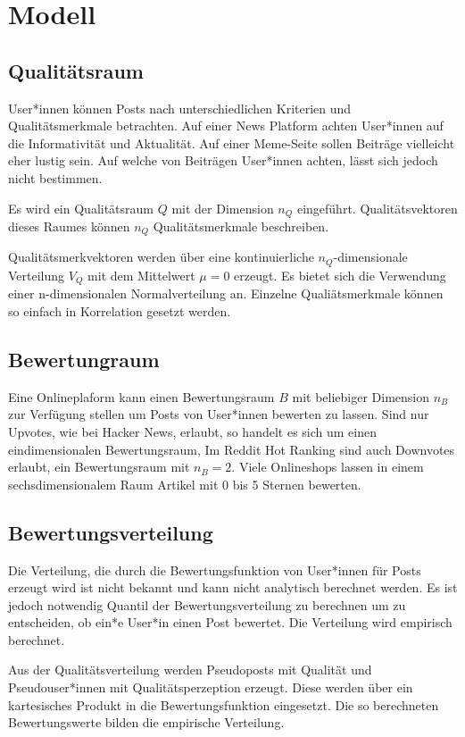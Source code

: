 \chapter{Modell}

\section{Qualitätsraum}

User*innen können Posts nach unterschiedlichen Kriterien und Qualitätsmerkmale betrachten. Auf einer News Platform achten User*innen auf die Informativität und Aktualität. Auf einer Meme-Seite sollen Beiträge vielleicht eher lustig sein. Auf welche  von Beiträgen User*innen achten, lässt sich jedoch nicht bestimmen.

Es wird ein Qualitätsraum $Q$ mit der Dimension $n_Q$ eingeführt. Qualitätsvektoren dieses Raumes können $n_Q$ Qualitätsmerkmale beschreiben.

Qualitätsmerkvektoren werden über eine kontinuierliche $n_Q$-dimensionale Verteilung $V_Q$ mit dem Mittelwert $\mu = 0$ erzeugt. Es bietet sich die Verwendung einer n-dimensionalen Normalverteilung an. Einzelne Qualiätsmerkmale können so einfach in Korrelation gesetzt werden. 

\section{Bewertungraum}

Eine Onlineplaform kann einen Bewertungsraum $B$ mit beliebiger Dimension $n_B$ zur Verfügung stellen um Posts von User*innen bewerten zu lassen. Sind nur Upvotes, wie bei Hacker News, erlaubt, so handelt es sich um einen eindimensionalen Bewertungsraum, Im Reddit Hot Ranking sind auch Downvotes erlaubt, ein Bewertungsraum mit $n_B = 2$. Viele Onlineshops lassen in einem sechsdimensionalem Raum Artikel mit 0 bis 5 Sternen bewerten.

\section{Bewertungsverteilung}

Die Verteilung, die durch die Bewertungsfunktion von User*innen für Posts erzeugt wird ist nicht bekannt und kann nicht analytisch berechnet werden. Es ist jedoch notwendig Quantil der Bewertungsverteilung zu berechnen um zu entscheiden, ob ein*e User*in einen Post bewertet. Die Verteilung wird empirisch berechnet.

Aus der Qualitätsverteilung werden Pseudoposts mit Qualität und Pseudouser*innen mit Qualitätsperzeption erzeugt. Diese werden über ein kartesisches Produkt in die Bewertungsfunktion eingesetzt. Die so berechneten Bewertungswerte bilden die empirische Verteilung. 

